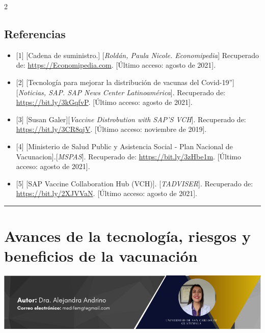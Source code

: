 \documentclass[12pt,spanish,Letterpaper,openany]{book}
\newcommand{\spaceoneminus}{\vspace{-1mm}}
\newcommand{\spacetwominus}{\vspace{-2mm}}
\newcommand{\spacefourminus}{\vspace{-4mm}}
\newcommand{\HRule}{\begin{center}\rule{0.5\linewidth}{0.2mm}\end{center}}
\begin{document}
\begin {multicols}{2}
\spacefourminus

\hypertarget{referencias-2}{%
\section{Referencias}\label{referencias-2}}

\spacetwominus
\spaceoneminus

\begin{itemize}
\item
  {[}1{]} {[}Cadena de suministro.{]} {[}\emph{Roldán, Paula Nicole. Economipedia}{]} Recuperado de: \url{https://Economipedia.com}. {[}Último acceso: agosto de 2021{]}.
\item
  {[}2{]} {[}Tecnología para mejorar la distribución de vacunas del Covid-19''{]}{[}\emph{Noticias, SAP. SAP News Center Latinoamérica}{]}.
  Recuperado de: \url{https://bit.ly/3kGqfvP}. {[}Último acceso: agosto de 2021{]}.
\item
  {[}3{]} {[}Susan Galer{]}{[}\emph{Vaccine Distrobution with SAP'S VCH}{]}. Recuperado de: \url{https://bit.ly/3CR8qjV}. {[}Último acceso: noviembre de 2019{]}.
\item
  {[}4{]} {[}Ministerio de Salud Public y Asistencia Social - Plan Nacional de Vacunacion{]}.{[}\emph{MSPAS}{]}. Recuperado de: \url{https://bit.ly/3zHbe1m}. {[}Último acceso: agosto de 2021{]}.
\item
  {[}5{]} {[}SAP Vaccine Collaboration Hub (VCH){]}. {[}\emph{TADVISER}{]}. Recuperado de: \url{https://bit.ly/2XJVVaN}. {[}Último acceso: agosto de 2021{]}.
\end{itemize}

\end {multicols}

\medskip

\HRule

\medskip

\hypertarget{andrino}{%
\chapter{Avances de la tecnología, riesgos y beneficios de la vacunación}\label{andrino}}

\begin{center}\includegraphics[width=1\linewidth]{images/Andrino} \end{center}
\end{document}
